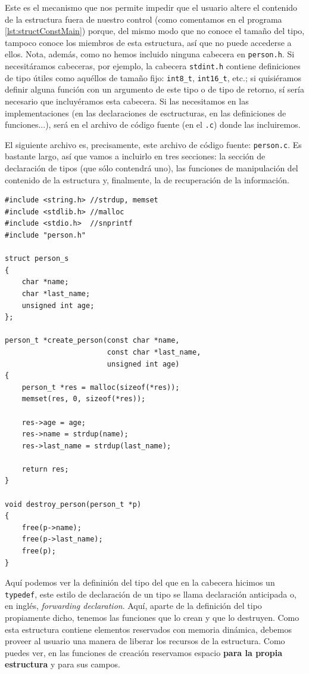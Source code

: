 \documentclass[a4paper]{article}
\begin{document}
Este es el mecanismo que nos permite impedir que el usuario altere el contenido
de la estructura fuera de nuestro control (como comentamos en el programa
\ref{lst:structConstMain}) porque, del mismo modo que no conoce el tamaño del tipo,
tampoco conoce los miembros de esta estructura, así que no puede accederse a
ellos. Nota, además, como no hemos incluido ninguna cabecera en \verb!person.h!.
Si necesitáramos cabeceras, por ejemplo, la cabecera \verb!stdint.h! contiene
definiciones de tipo útiles como aquéllos de tamaño fijo: \verb!int8_t!,
\verb!int16_t!, etc.; si quisiéramos definir alguna función con un argumento
de este tipo o de tipo de retorno, sí sería necesario que incluyéramos esta
cabecera. Si las necesitamos en las implementaciones (en las declaraciones de
esctructuras, en las definiciones de funciones...), será en el archivo de
código fuente (en el \verb!.c!) donde las incluiremos.

El siguiente archivo es, precisamente, este archivo de código fuente:
\verb|person.c|. Es bastante largo, así que vamos a incluirlo en tres secciones:
la sección de declaración de tipos (que sólo contendrá uno), las funciones de
manipulación del contenido de la estructura y, finalmente, la de recuperación
de la información.

\noindent
\begin{minipage}[H]{\linewidth}
\mbox{}
\begin{lstlisting}[style=C, label={lst:finalExDefinition},
caption={Ejemplo final de programa -- \texttt{person.c} definiciones}]
#include <string.h> //strdup, memset
#include <stdlib.h> //malloc
#include <stdio.h>  //snprintf
#include "person.h"

struct person_s
{
    char *name;
    char *last_name;
    unsigned int age;
};

person_t *create_person(const char *name,
                        const char *last_name,
                        unsigned int age)
{
    person_t *res = malloc(sizeof(*res));
    memset(res, 0, sizeof(*res));

    res->age = age;
    res->name = strdup(name);
    res->last_name = strdup(last_name);

    return res;
}

void destroy_person(person_t *p)
{
    free(p->name);
    free(p->last_name);
    free(p);
}
\end{lstlisting}
\end{minipage}

Aquí podemos ver la defininión del tipo del que en la cabecera hicimos un
\verb!typedef!, este estilo de declaración de un tipo se llama declaración
anticipada o, en inglés, \textit{forwarding declaration}. Aquí, aparte de la
definición del tipo propiamente dicho, tenemos las funciones que lo crean
y que lo destruyen. Como esta estructura contiene elementos reservados con
memoria dinámica, debemos proveer al usuario una manera de liberar los recursos
de la estructura. Como puedes ver, en las funciones de creación reservamos
espacio \textbf{para la propia estructura} y para sus campos.
\end{document}
